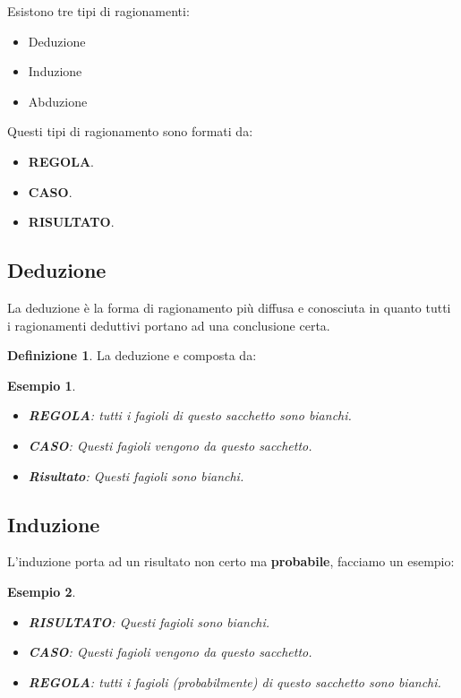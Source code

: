 \documentclass[../main.tex, class=letterpaper]{subfiles}
\newtheorem{exmp}{Esempio}[section]
\theoremstyle{definition}
\newtheorem{definition}{Definizione}[section]
\begin{document}
Esistono tre tipi di ragionamenti:
\begin{itemize}
        \item Deduzione
        \item Induzione
        \item Abduzione
\end{itemize}

Questi tipi di ragionamento sono formati da:
\begin{itemize}
\item \textbf{REGOLA}.
\item \textbf{CASO}.
\item \textbf{RISULTATO}.
\end{itemize}



\subsection{Deduzione}
La deduzione è la forma di ragionamento più diffusa e conosciuta in quanto  tutti i ragionamenti deduttivi portano ad una conclusione certa.
\begin{definition}
        La deduzione e composta da:
        \begin{exmp}
                \begin{itemize}
                        \item\textbf{REGOLA}: tutti i fagioli di questo sacchetto sono bianchi.
                        \item\textbf{CASO}: Questi fagioli vengono da questo sacchetto.
                        \item \textbf{Risultato}: Questi fagioli sono bianchi. 
                \end{itemize}
        \end{exmp}
\end{definition}



\subsection{Induzione}
L'induzione porta ad un risultato non certo ma \textbf{probabile}, facciamo un esempio:
\begin{exmp}
        \begin{itemize}
                \item \textbf{RISULTATO}: Questi fagioli sono bianchi. 
                \item\textbf{CASO}: Questi fagioli vengono da questo sacchetto.
                \item\textbf{REGOLA}: tutti i fagioli (probabilmente) di questo sacchetto sono bianchi.
        \end{itemize}
\end{exmp}
\end{document}
